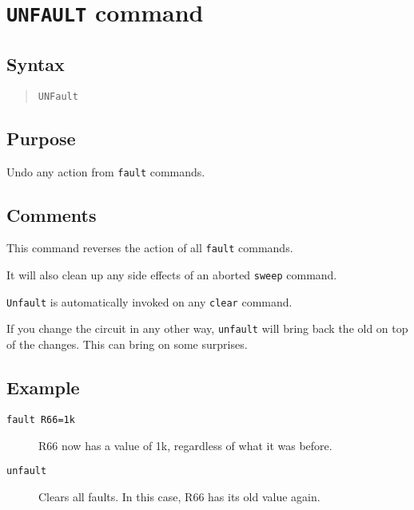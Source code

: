 \section{{\tt UNFAULT} command}
\subsection{Syntax}
\begin{verse}
{\tt UNFault}
\end{verse}
\subsection{Purpose}

Undo any action from {\tt fault} commands.
\subsection{Comments}

This command reverses the action of all {\tt fault} commands.

It will also clean up any side effects of an aborted {\tt sweep} command.

{\tt Unfault} is automatically invoked on any {\tt clear} command.

If you change the circuit in any other way, {\tt unfault} will bring back the
old on top of the changes.  This can bring on some surprises.
\subsection{Example}

\begin{description}

\item[{\tt fault R66=1k}] R66 now has a value of 1k, regardless of what it
was before.

\item[{\tt unfault}] Clears all faults.  In this case, R66 has its old value
again.

\end{description}

